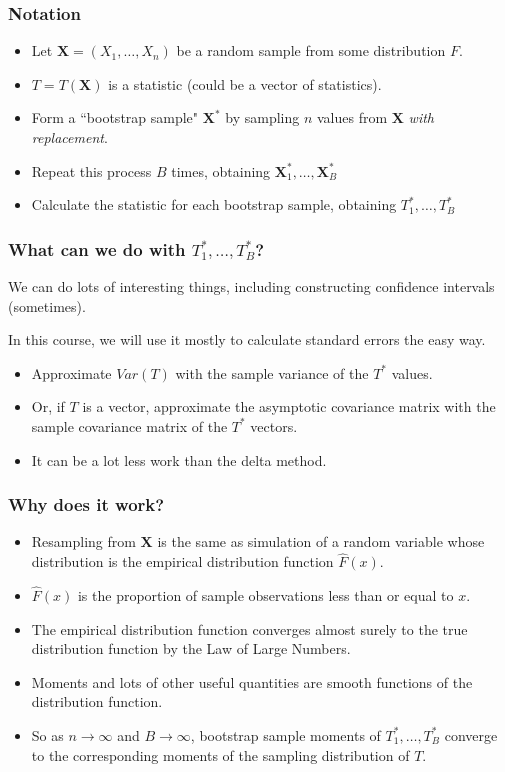 \documentclass[serif]{beamer} %
\begin{document}
\begin{frame}
\frametitle{Notation}
  \begin{itemize}
    \item Let $\mathbf{X} = (X_1, \ldots, X_n)$ be a random sample from some distribution $F$.
    \item $T=T(\mathbf{X})$ is a statistic (could be a vector of statistics).
    \item Form a ``bootstrap sample" $\mathbf{X}^*$ by sampling $n$ values from $\mathbf{X}$ \emph{with replacement}.
    \item Repeat this process $B$ times, obtaining $\mathbf{X}^*_1, \ldots, \mathbf{X}^*_B$
    \item Calculate the statistic for each bootstrap sample, obtaining $T^*_1, \ldots, T^*_B$
  \end{itemize}
\end{frame}

\begin{frame}
\frametitle{What can we do with $T^*_1, \ldots, T^*_B$?}
We can do lots of interesting things, including constructing confidence intervals (sometimes).

\vspace{5mm}

In this course, we will use it mostly to calculate standard errors the easy way.

\vspace{5mm}


  \begin{itemize}
    \item Approximate $Var(T)$ with the sample variance of the $T^*$ values.
    \item Or, if $T$ is a vector, approximate the asymptotic covariance matrix with the sample covariance matrix of the $T^*$ vectors.
    \item It can be a lot less work than the delta method.
  \end{itemize}
\end{frame}

\begin{frame}
\frametitle{Why does it work?}
% 
  \begin{itemize}
    \item Resampling from $\mathbf{X}$ is the same as simulation of a random variable whose distribution is the empirical distribution function $\widehat{F}(x)$. 
    \item $\widehat{F}(x)$ is the proportion of sample observations less than or equal to $x$.
    \item The empirical distribution function converges almost surely to the true distribution function by the Law of Large Numbers.
    \item Moments and lots of other useful quantities are smooth functions of the distribution function.
    \item So as $n\rightarrow\infty$ and $B\rightarrow\infty$, bootstrap sample moments of $T^*_1, \ldots, T^*_B$ converge to the corresponding moments of the sampling distribution of $T$.
  \end{itemize}
\end{frame}
\end{document}
